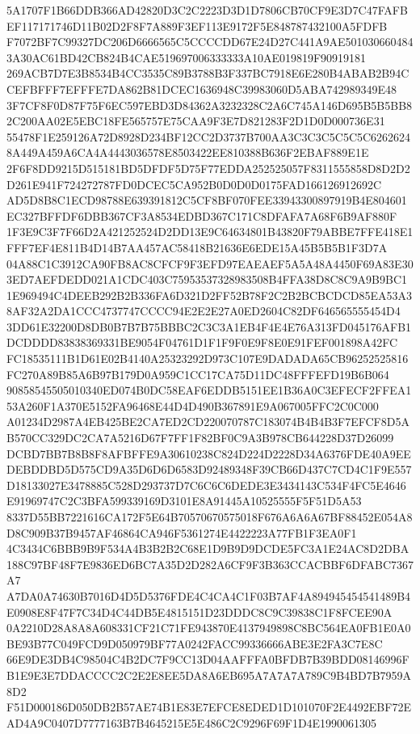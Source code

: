 \documentclass[UTF8,fontset=fandol,zihao=-4,a4paper]{ctexart}
\begin{document}
{{5A1707F1B66DDB366AD42820D3C2C2223D3D1D7806CB70CF9E3D7C47FAFBEF117171746D11B02D2F8F7A889F3EF113E9172F5E848787432100A5FDFB
F7072BF7C99327DC206D6666565C5CCCCDD67E24D27C441A9AE5010306604843A30AC61BD42CB824B4CAE519697006333333A10AE019819F90919181
269ACB7D7E3B8534B4CC3535C89B3788B3F337BC7918E6E280B4ABAB2B94CCEFBFFF7EFFFE7DA862B81DCEC1636948C39983060D5ABA742989349E48
3F7CF8F0D87F75F6EC597EBD3D84362A3232328C2A6C745A146D695B5B5BB82C200AA02E5EBC18FE565757E75CAA9F3E7D821283F2D1D0D000736E31
55478F1E259126A72D8928D234BF12CC2D3737B700AA3C3C3C5C5C5C62626248A449A459A6CA4A4443036578E8503422EE810388B636F2EBAF889E1E
2F6F8DD9215D515181BD5DFDF5D75F77EDDA252525057F8311555858D8D2D2D261E941F724272787FD0DCEC5CA952B0D0D0D0175FAD166126912692C
AD5D8B8C1ECD98788E639391812C5CF8BF070FEE33943300897919B4E804601EC327BFFDF6DBB367CF3A8534EDBD367C171C8DFAFA7A68F6B9AF880F
1F3E9C3F7F66D2A421252524D2DD13E9C64634801B43820F79ABBE7FFE418E1FFF7EF4E811B4D14B7AA457AC58418B21636E6EDE15A45B5B5B1F3D7A
04A88C1C3912CA90FB8AC8CFCF9F3EFD97EAEAEF5A5A48A4450F69A83E303ED7AEFDEDD021A1CDC403C75953537328983508B4FFA38D8C8C9A9B9BC1
1E969494C4DEEB292B2B336FA6D321D2FF52B78F2C2B2BCBCDCD85EA53A38AF32A2DA1CCC4737747CCCC94E2E2E27A0ED2604C82DF646565555454D4
3DD61E32200D8DB0B7B7B75BBBC2C3C3A1EB4F4E4E76A313FD045176AFB1DCDDDD83838369331BE9054F04761D1F1F9F0E9F8E0E91FEF001898A42FC
FC18535111B1D61E02B4140A25323292D973C107E9DADADA65CB96252525816FC270A89B85A6B97B179D0A959C1CC17CA75D11DC48FFFEFD19B6B064
90858545505010340ED074B0DC58EAF6EDDB5151EE1B36A0C3EFECF2FFEA153A260F1A370E5152FA96468E44D4D490B367891E9A067005FFC2C0C000
A01234D2987A4EB425BE2CA7ED2CD220070787C183074B4B4B3F7EFCF8D5AB570CC329DC2CA7A5216D67F7FF1F82BF0C9A3B978CB644228D37D26099
DCBD7BB7B8B8F8AFBFFE9A30610238C824D224D2228D34A6376FDE40A9EEDEBDDBD5D575CD9A35D6D6D6583D92489348F39CB66D437C7CD4C1F9E557
D18133027E3478885C528D293737D7C6C6C6DEDE3E3434143C534F4FC5E4646E91969747C2C3BFA599339169D3101E8A91445A10525555F5F51D5A53
8337D55BB7221616CA172F5E64B70570670575018F676A6A6A67BF88452E054A8D8C909B37B9457AF46864CA946F5361274E4422223A77FB1F3EA0F1
4C3434C6BBB9B9F534A4B3B2B2C68E1D9B9D9DCDE5FC3A1E24AC8D2DBA188C97BF48F7E9836ED6BC7A35D2D282A6CF9F3B363CCACBBF6DFABC7367A7
A7DA0A74630B7016D4D5D5376FDE4C4CA4C1F03B7AF4A894945454541489B4E0908E8F47F7C34D4C44DB5E4815151D23DDDC8C9C39838C1F8FCEE90A
0A2210D28A8A8A608331CF21C71FE943870E4137949898C8BC564EA0FB1E0A0BE93B77C049FCD9D050979BF77A0242FACC99336666ABE3E2FA3C7E8C
66E9DE3DB4C98504C4B2DC7F9CC13D04AAFFFA0BFDB7B39BDD08146996FB1E9E3E7DDACCCC2C2E2E8EE5DA8A6EB695A7A7A7A789C9B4BD7B7959A8D2
F51D000186D050DB2B57AE74B1E83E7EFCE8EDED1D101070F2E4492EBF72EAD4A9C0407D7777163B7B4645215E5E486C2C9296F69F1D4E1990061305
}}
\end{document}
